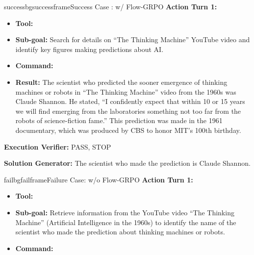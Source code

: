 \begin{small}
\begin{center}
\begin{casebox}{successbg}{successframe}{Success Case : \model w/ Flow-GRPO}
    \textbf{Action Turn 1:}
    \begin{itemize}[nosep, leftmargin=*]
        \item \textbf{Tool:} 
        \item \textbf{Sub-goal:} Search for details on ``The Thinking Machine'' YouTube video and identify key figures making predictions about AI.
        \item \textbf{Command:} 
        
        \item \textbf{Result:} The scientist who predicted the sooner emergence of thinking machines or robots in ``The Thinking Machine'' video from the 1960s was Claude Shannon. He stated, ``I confidently expect that within 10 or 15 years we will find emerging from the laboratories something not too far from the robots of science-fiction fame.'' This prediction was made in the 1961 documentary, which was produced by CBS to honor MIT's 100th birthday.
    \end{itemize}

    \vspace{1em}

    \textbf{Execution Verifier:} \textcolor{successframe}{PASS, STOP}

    \vspace{1em}

    \textbf{Solution Generator: } \textcolor{successframe}{The scientist who made the prediction is Claude Shannon.}

\end{casebox}


\begin{casebox}{failbg}{failframe}{Failure Case: \model w/o Flow-GRPO}
    \textbf{Action Turn 1:}
    \begin{itemize}[nosep, leftmargin=*]
        \item \textbf{Tool:} 
        \item \textbf{Sub-goal:} Retrieve information from the YouTube video ``The Thinking Machine'' (Artificial Intelligence in the 1960s) to identify the name of the scientist who made the prediction about thinking machines or robots.
        \item \textbf{Command:} 
        

\end{itemize}
\end{casebox}
\end{center}
\end{small}
